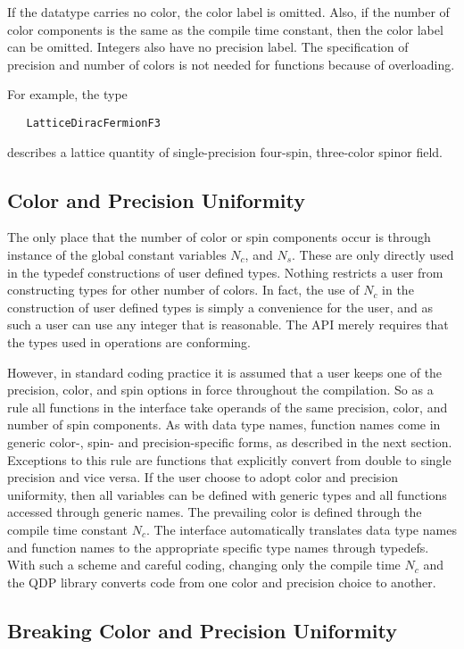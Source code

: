 \documentclass[12pt,letterpaper]{article}
\begin{document}
If the datatype carries no color, the color label is omitted. Also,
if the number of color components is the same as the compile
time constant, then the color label can be omitted.
Integers also have no precision label. The specification of
precision and number of colors is not needed for functions because
of overloading.

For example, the type
%
\begin{verbatim}
   LatticeDiracFermionF3
\end{verbatim}
%
describes a lattice quantity of single-precision four-spin, 
three-color spinor field.

\subsection{Color and Precision Uniformity}

The only place that the number of color or spin components occur
is through instance of the global constant variables $N_c$, and $N_s$. These 
are only directly used in the typedef constructions of user defined types. Nothing
restricts a user from constructing types for other number of colors. In fact,
the use of $N_c$ in the construction of user defined types is simply a
convenience for the user, and as such a user can use any integer that is
reasonable. The API merely requires that the types used in operations are conforming.

However, in standard coding practice it is assumed that a user keeps
one of the precision, color, and spin options in force throughout the
compilation.  So as a rule all functions in the interface take
operands of the same precision, color, and number of spin
components. As with data type names, function names come in generic
color-, spin- and precision-specific forms, as described in the next
section.  Exceptions to this rule are functions that explicitly
convert from double to single precision and vice versa.  If the user
choose to adopt color and precision uniformity, then all variables can
be defined with generic types and all functions accessed through
generic names.  The prevailing color is defined through
the compile time constant $N_c$.  The interface automatically
translates data type names and function names to the appropriate
specific type names through typedefs.  With such a scheme and careful
coding, changing only the compile time $N_c$ and the QDP library
converts code from one color and precision choice to another.

\subsection{Breaking Color and Precision Uniformity}
\end{document}
